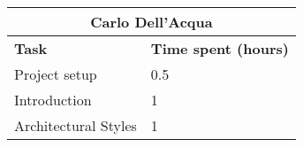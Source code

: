 \begin{table}[h]
  \centering
  \begin{tabular}{l|l}
    \multicolumn{2}{c}{\textbf{Carlo Dell'Acqua}} \\
    \hline
    \textbf{Task} & \textbf{Time spent (hours)}\\
    \hline
    Project setup & 0.5 \\
    Introduction & 1 \\
    Architectural Styles & 1 \\
  \end{tabular}
\end{table}